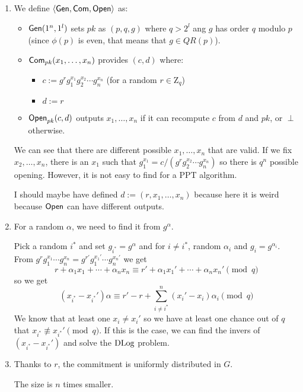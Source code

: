 \subsection{}
\begin{solution}
  \begin{enumerate}
    \item
      We define $\langle \operatorname{\mathsf{Gen}}, \operatorname{\mathsf{Com}}, \operatorname{\mathsf{Open}} \rangle$ as:
      \begin{itemize}
        \item $\operatorname{\mathsf{Gen}}(1^n, 1^l)$ sets $pk$ as $(p,q,g)$ where $q > 2^l$ ang $g$ has order $q$ modulo $p$ (since $\phi(p)$ is even, that means that $g \in QR(p)$).
        \item $\operatorname{\mathsf{Com}}_{pk}(x_1, \ldots, x_n)$ provides $(c,d)$ where:
          \begin{itemize}
            \item $c := g^r g_1^{x_1} g_2^{x_2} \cdots g_n^{x_n}$ (for a random $r \in \mathrm{Z}_q$)
            \item $d := r$
          \end{itemize}
        \item $\operatorname{\mathsf{Open}}_{pk}(c,d)$ outputs $x_1, \ldots, x_n$ if it can recompute $c$ from $d$ and $pk$,
          or $\perp$ otherwise.
      \end{itemize}
      We can see that there are different possible $x_1, \ldots, x_n$ that are valid.
      If we fix $x_2, \ldots, x_n$,
      there is an $x_1$ such that $g_1^{x_1} = c / (g^r g_2^{x_2} \cdots g_n^{x_n})$
      so there is $q^n$ possible opening.
      However, it is not easy to find for a PPT algorithm.

      I should maybe have defined $d := (r, x_1, \ldots, x_n)$ because here it is weird because $\operatorname{\mathsf{Open}}$ can have different outputs.
    \item
      For a random $\alpha$, we need to find it from $g^\alpha$.

      Pick a random $i^*$ and set $g_{i^*} = g^\alpha$ and for $i \neq i^*$, random $\alpha_i$ and $g_i = g^{\alpha_i}$.
      From $g^rg_1^{x_1} \cdots g_n^{x_n} = g^{r'}g_1^{x_1'} \cdots g_n^{x_n'}$ we get
      \[ r + \alpha_1 x_1 + \cdots + \alpha_n x_n \equiv r' + \alpha_1 x_1' + \cdots + \alpha_n x_n' \pmod{q} \]
      so we get
      \[ (x_{i^*} - x_{i^*}') \alpha \equiv r' - r + \sum_{i \neq i^*}^n (x_i' - x_i) \alpha_i \pmod{q} \]
      We know that at least one $x_i \neq x_i'$ so we have at least one chance out of $q$ that $x_{i^*} \not\equiv x_{i^*}' \pmod{q}$.
      If this is the case, we can find the invers of $(x_{i^*} - x_{i^*}')$ and solve the $\operatorname{DLog}$ problem.
    \item
      Thanks to $r$, the commitment is uniformly distributed in $G$.

      The size is $n$ times smaller.
  \end{enumerate}
\end{solution}

